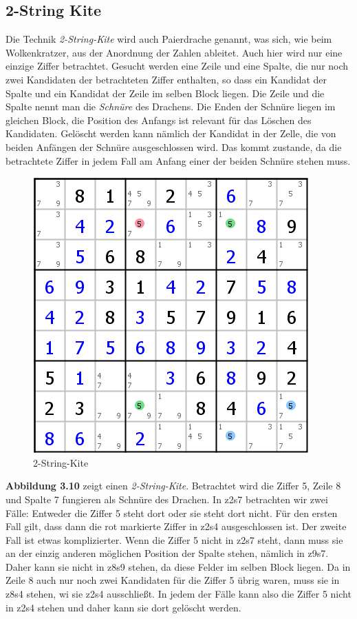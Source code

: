 \newpage
\subsection{2-String Kite}
Die Technik \textit{2-String-Kite} wird auch Paierdrache genannt, was sich, wie beim Wolkenkratzer, aus der Anordnung der Zahlen ableitet. Auch hier wird nur eine einzige Ziffer betrachtet. Gesucht werden eine Zeile und eine Spalte, die nur noch zwei Kandidaten der betrachteten Ziffer enthalten, so dass ein Kandidat der Spalte und ein Kandidat der Zeile im selben Block liegen. Die Zeile und die Spalte nennt man die \textit{Schnüre} des Drachens. Die Enden der Schnüre liegen im gleichen Block, die Position des Anfangs ist relevant für das Löschen des Kandidaten. Gelöscht werden kann nämlich der Kandidat in der Zelle, die von beiden Anfängen der Schnüre ausgeschlossen wird. Das kommt zustande, da die betrachtete Ziffer in jedem Fall am Anfang einer der beiden Schnüre stehen muss.

\begin{figure}[h]
\begin{center}
\includegraphics{./img/2stringkite.png}
\caption{2-String-Kite}
\end{center}
\end{figure}

\textbf{Abbildung 3.10} zeigt einen \textit{2-String-Kite}. Betrachtet wird die Ziffer 5, Zeile 8 und Spalte 7 fungieren als Schnüre des Drachen. In z2s7 betrachten wir zwei Fälle: Entweder die Ziffer 5 steht dort oder sie steht dort nicht. Für den ersten Fall gilt, dass dann die rot markierte Ziffer in z2s4 ausgeschlossen ist. Der zweite Fall ist etwas komplizierter. Wenn die Ziffer 5 nicht in z2s7 steht, dann muss sie an der einzig anderen möglichen Position der Spalte stehen, nämlich in z9s7. Daher kann sie nicht in z8s9 stehen, da diese Felder im selben Block liegen. Da in Zeile 8 auch nur noch zwei Kandidaten für die Ziffer 5 übrig waren, muss sie in z8s4 stehen, wi sie z2s4 ausschließt. In jedem der Fälle kann also die Ziffer 5 nicht in z2s4 stehen und daher kann sie dort gelöscht werden.